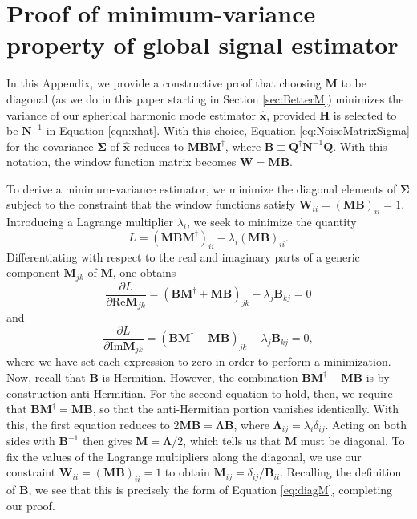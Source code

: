 \documentclass[twocolumn,apj,numberedappendix]{emulateapj}
\newcommand{\xhat}{\hat{\mathbf{x}}}
\newcommand{\N}{\mathbf{N}}
\newcommand{\Hmat}{\mathbf{H}}
\newcommand{\Q}{\mathbf{Q}}
\newcommand{\M}{\mathbf{M}}
\newcommand{\W}{\mathbf{W}}
\begin{document}
\appendix
\section{Proof of minimum-variance property of global signal estimator}
\label{minVarProof}

In this Appendix, we provide a constructive proof that choosing $\M$ to be diagonal (as we do in this paper starting in Section \ref{sec:BetterM}) minimizes the variance of our spherical harmonic mode estimator $\xhat$, provided $\Hmat$ is selected to be $\mathbf{N}^{-1}$ in Equation \eqref{eqn:xhat}. With this choice, Equation \eqref{eq:NoiseMatrixSigma} for the covariance $\boldsymbol \Sigma$ of $\xhat$ reduces to  $\M \mathbf{B} \M^\dagger$, where $\mathbf{B} \equiv \Q^\dagger \N^{-1} \Q$. With this notation, the window function matrix becomes $\W = \M \mathbf{B}$.

To derive a minimum-variance estimator, we minimize the diagonal elements of $\boldsymbol \Sigma$ subject to the constraint that the window functions satisfy $\W_{ii} = (\M \mathbf{B})_{ii} =1$. Introducing a Lagrange multiplier $\lambda_i$, we seek to minimize the quantity
\begin{equation}
L = (\M \mathbf{B} \M^\dagger)_{ii} - \lambda_i  (\M \mathbf{B})_{ii}.
\end{equation}
Differentiating with respect to the real and imaginary parts of a generic component $\M_{jk}$ of $\M$, one obtains
\begin{equation}
\frac{\partial L}{\partial \textrm{Re} \M_{jk}} = (\mathbf{B} \M^\dagger + \M \mathbf{B})_{jk} - \lambda_j \mathbf{B}_{kj} =0
\end{equation}
and
\begin{equation}
\frac{\partial L}{\partial \textrm{Im} \M_{jk}} = (\mathbf{B} \M^\dagger - \M \mathbf{B})_{jk} - \lambda_j \mathbf{B}_{kj} =0,
\end{equation}
where we have set each expression to zero in order to perform a minimization. Now, recall that $\mathbf{B}$ is Hermitian. However, the combination $\mathbf{B} \M^\dagger - \M \mathbf{B}$ is by construction anti-Hermitian. For the second equation to hold, then, we require that $\mathbf{B} \M^\dagger = \M \mathbf{B}$, so that the anti-Hermitian portion vanishes identically. With this, the first equation reduces to $2 \M \mathbf{B} = \boldsymbol \Lambda \mathbf{B}$, where $\boldsymbol \Lambda_{ij} = \lambda_i \delta_{ij}$. Acting on both sides with $\mathbf{B}^{-1}$ then gives $\M = \boldsymbol \Lambda / 2$, which tells us that $\M$ must be diagonal. To fix the values of the Lagrange multipliers along the diagonal, we use our constraint $\W_{ii} = (\M \mathbf{B})_{ii} =1$ to obtain $\M_{ij} = \delta_{ij} / \mathbf{B}_{ii}$. Recalling the definition of $\mathbf{B}$, we see that this is precisely the form of Equation \eqref{eq:diagM}, completing our proof.
\end{document}
